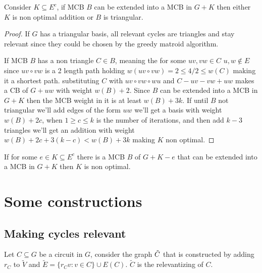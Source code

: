 \begin{theorem}
Consider $K\subseteq E^c$, if MCB $B$ can be extended into a MCB in $G+K$ then either $K$ is non optimal addition or $B$ is triangular.
\end{theorem}
\begin{proof}
    If $G$ has a triangular basis, all relevant cycles are triangles and stay relevant since they could be chosen by the greedy matroid algorithm.


    If MCB $B$ has a non triangle $C\in B$, meaning the for some $uv,vw\in C$ $u,w\notin E$ since $uv\circ vw$ is a 2 length path holding  $w(uv\circ vw)=2\leq 4/2\leq w(C)$ making it a shortest path.
    substituting  $C$ with $uv\circ vw\circ wu$ and $C-uv-vw+uw$ makes a CB of $G+uw$ with weight $w(B)+2$.
    Since $B$ can be extended into a MCB in $G+K$ then the MCB weight in it is at least $w(B)+3k$. If until $B$ not triangular we'll add edges of the form $uw$ we'll get a basis with weight $w(B)+2c$, when $1\geq c\leq k$ is the number of iterations, and then add $k-3$ triangles we'll get an addition with weight $w(B)+2c+3(k-c)<w(B)+3k$ making $K$ non optimal.
\end{proof}
\begin{corollary}
    If for some $e\in K\subseteq E^c$ there is a MCB $B$ of $G+K-e$ that can be extended into a MCB in $G+K$ then $K$ is non optimal.
\end{corollary}

\section{Some constructions}
\subsection{Making cycles relevant}
\begin{definition}
    Let $C\subseteq G$ be a circuit in $G$, consider the graph $\Tilde{C}$ that is constructed by adding $r_C$ to $\tilde V$ and $\tilde E=\{r_Cv:v\in C\}\cup E(C)$. $\tilde C$ is the relevantizing  of $C$.
\end{definition}

